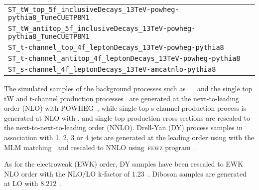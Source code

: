 \begin{table}[htbp]
\begin{tabular}{lc}
      {\texttt{ST\_tW\_top\_5f\_inclusiveDecays\_13TeV-powheg-pythia8\_TuneCUETP8M1}} \\
      {\texttt{ST\_tW\_antitop\_5f\_inclusiveDecays\_13TeV-powheg-pythia8\_TuneCUETP8M1}} \\
      {\texttt{ST\_t-channel\_top\_4f\_leptonDecays\_13TeV-powheg-pythia8}} \\
      {\texttt{ST\_t-channel\_antitop\_4f\_leptonDecays\_13TeV-powheg-pythia8}} \\
      {\texttt{ST\_s-channel\_4f\_leptonDecays\_13TeV-amcatnlo-pythia8}} \\
\hline%
    \end{tabular}
\end{table}



The simulated samples of the background processes such as 
~\ttbar~\cite{Frixione:2007nw} and the single top tW and t-channel
production processes~\cite{Frederix:2012dh} are generated at the
next-to-leading order (NLO) with POWHEG~\cite{Alioli:2009je}, while
single top s-channel production process is generated at NLO with
\MADGRAPH. \ttbar and single top production cross sections are
rescaled to the next-to-next-to-leading order (NNLO). 
Drell-Yan (DY)
process samples in association with 1, 2, 3 or 4 jets are generated
at the leading order using \MADGRAPH with the MLM
matching~\cite{Alwall:2007fs} and rescaled to NNLO using~\textsc{fewz}
program~\cite{Gavin:2010az,Li:2012wna,Gavin:2012sy}. 

As for the electroweak (EWK) order, DY samples have been rescaled to EWK NLO order with the NLO/LO k-factor of 1.23~\cite{DYkfactor}. Diboson samples
are generated at LO with {\PYTHIA}8.212~\cite{Sjostrand:2007gs}.

